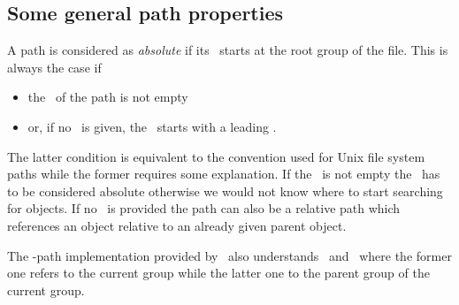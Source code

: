 \subsection{Some general path properties}

A path is considered as \emph{absolute} if its \osection\ starts at the root
group of the file. This is always  the case if 
\begin{itemize}
\item the \fsection\ of the path is not empty
\item or, if no \fsection\ is given, the \osection\ starts with a leading \osep.
\end{itemize}
The latter condition is equivalent to the convention used for Unix file system
paths while the former requires some explanation. 
If the \fsection\ is not empty the \osection\ has to be considered absolute
otherwise we would not know where to start searching for objects. 
If no \fsection\ is provided the path can also be a relative path which
references an object relative to an already given parent object.

The \nexus-path implementation provided by \libpniio\ also understands 
\cgroup\ and \pgroup\ where the former one refers to the current group while 
the latter one to the parent group of the current group.

